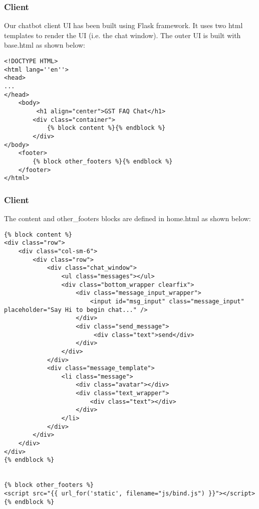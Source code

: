 \begin{frame}[fragile]\frametitle{Client}
 Our chatbot client UI has been built using Flask framework. It uses two html templates to render the UI (i.e. the chat window). 
 The outer UI is built with base.html as shown below:
 \tiny
\begin{lstlisting}
<!DOCTYPE HTML>
<html lang=''en''>
<head>
...
</head>
    <body>
         <h1 align="center">GST FAQ Chat</h1>
        <div class="container">
            {% block content %}{% endblock %}
        </div>
</body>
    <footer>
        {% block other_footers %}{% endblock %}
    </footer>
</html>
\end{lstlisting}
\end{frame}

 \begin{frame}[fragile]\frametitle{Client}
The content and other\_footers blocks are defined in home.html as shown below:
\tiny
\begin{lstlisting}
{% block content %}
<div class="row">
    <div class="col-sm-6">
        <div class="row">
            <div class="chat_window">
                <ul class="messages"></ul>
                <div class="bottom_wrapper clearfix">
                    <div class="message_input_wrapper">
                        <input id="msg_input" class="message_input" placeholder="Say Hi to begin chat..." />
                    </div>
                    <div class="send_message">
                         <div class="text">send</div>
                    </div>
                </div>
            </div>
            <div class="message_template">
                <li class="message">
                    <div class="avatar"></div>
                    <div class="text_wrapper">
                        <div class="text"></div>
                    </div>
                </li>
            </div>
        </div>
    </div>
</div>
{% endblock %}


{% block other_footers %}
<script src="{{ url_for('static', filename="js/bind.js") }}"></script>
{% endblock %}
\end{lstlisting}
\end{frame}

